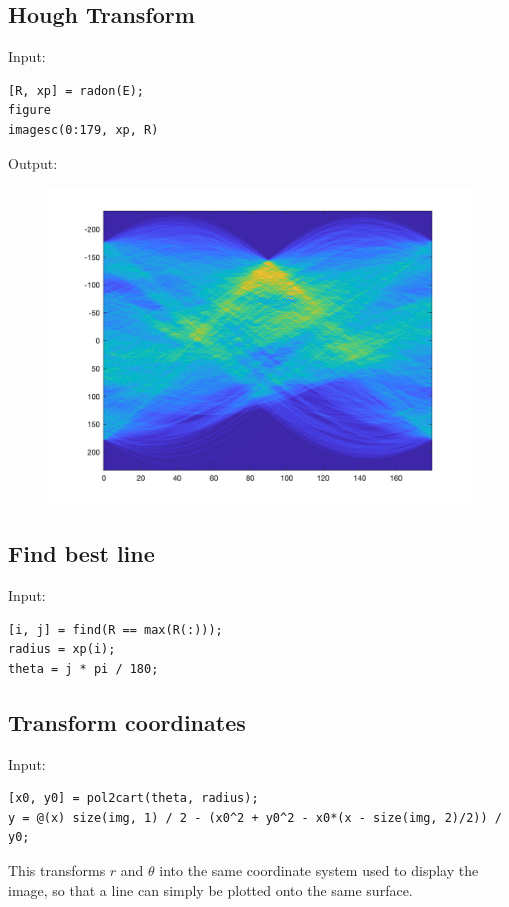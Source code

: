 \documentclass[12pt, a4paper]{article}
\begin{document}
\subsection{Hough Transform}
Input:
\begin{verbatim}
[R, xp] = radon(E);
figure
imagesc(0:179, xp, R)
\end{verbatim}
Output:
\begin{figure}[H]
	\centering
	\includegraphics[width=\textwidth]{fig15.png}
\end{figure}

\subsection{Find best line}
Input:
\begin{verbatim}
[i, j] = find(R == max(R(:)));
radius = xp(i);
theta = j * pi / 180;
\end{verbatim}

\subsection{Transform coordinates}
Input:
\begin{verbatim}
[x0, y0] = pol2cart(theta, radius);
y = @(x) size(img, 1) / 2 - (x0^2 + y0^2 - x0*(x - size(img, 2)/2)) / y0;
\end{verbatim}
This transforms $r$ and $\theta$ into the same coordinate system used to display the image, so that a line can simply be plotted onto the same surface.
\newpage
\end{document}
